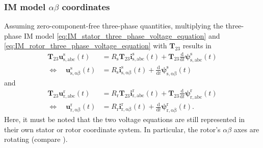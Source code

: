 \begin{frame}
	\frametitle{IM model $\alpha\beta$ coordinates}
    Assuming zero-component-free three-phase quantities, multiplying the three-phase IM model \eqref{eq:IM_stator_three_phase_voltage_equation} and \eqref{eq:IM_rotor_three_phase_voltage_equation} with $\bm{T}_{23}$ results in
    \begin{equation}
        \begin{split}
        \bm{T}_{23}\bm{u}^\mathrm{s}_\mathrm{s,abc}(t) &= R_\mathrm{s} \bm{T}_{23}\bm{i}^\mathrm{s}_\mathrm{s,abc}(t)+ \bm{T}_{23}\frac{\mathrm{d}}{\mathrm{d}t}\bm{\psi}^\mathrm{s}_\mathrm{s,abc}(t)\\
        \Leftrightarrow\quad \bm{u}^\mathrm{s}_\mathrm{s,\alpha\beta}(t) &= R_\mathrm{s} \bm{i}^\mathrm{s}_\mathrm{s,\alpha\beta}(t)+ \frac{\mathrm{d}}{\mathrm{d}t}\bm{\psi}^\mathrm{s}_\mathrm{s,\alpha\beta}(t) 
    \end{split}
\end{equation}
and
\begin{equation}
    \begin{split}
    \bm{T}_{23}\bm{u}^\mathrm{r}_\mathrm{r,abc}(t) &= R_\mathrm{r} \bm{T}_{23}\bm{i}^\mathrm{r}_\mathrm{r,abc}(t)+ \bm{T}_{23}\frac{\mathrm{d}}{\mathrm{d}t}\bm{\psi}^\mathrm{r}_\mathrm{r,abc}(t)\\
    \Leftrightarrow\quad  \bm{u}^\mathrm{r}_\mathrm{r,\alpha\beta}(t) &= R_\mathrm{r} \bm{i}^\mathrm{r}_\mathrm{r,\alpha\beta}(t)+ \frac{\mathrm{d}}{\mathrm{d}t}\bm{\psi}^\mathrm{r}_\mathrm{r,\alpha\beta}(t).
\end{split}
\end{equation}
Here, it must be noted that the two voltage equations are still represented in their own stator or rotor coordinate system. In particular, the rotor's $\alpha\beta$ axes are rotating (compare ). 
\end{frame}

